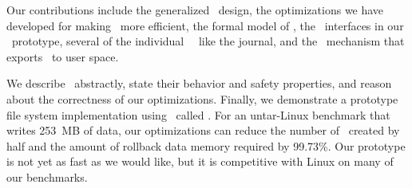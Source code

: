 Our contributions include the generalized \patch\ design, the
 optimizations we have developed for making \patches\ more efficient,
 the formal model of \patches, the \module\ interfaces in our \Kudos\
 prototype, several of the individual \Kudos\ \modules\ like the journal,
 and the \patchgroup\ mechanism that exports \patches\ to user space.


We describe \patches\ abstractly, state their behavior and safety
 properties, and reason about the correctness of our optimizations.
%
Finally, we demonstrate a prototype file system implementation using
 \patches\ called \Kudos.
%
For an untar-Linux benchmark that writes 253~MB of data, our optimizations
 can reduce the number of \patches\ created by half and the amount of
 rollback data memory required by 99.73\%. 
%
Our prototype is not yet as fast as we would like, but it is competitive
 with Linux on many of our benchmarks.
